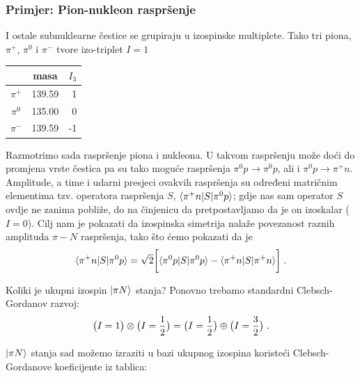 \subsubsection*{Primjer: Pion-nukleon raspršenje}

I ostale subnuklearne čestice se grupiraju u izospinske multiplete.
Tako tri piona, $\pi^+$, $\pi^0$ i $\pi^-$ tvore izo-triplet $I=1$
\begin{center}
\begin{tabular}{ccr}
  & masa & $I_3$ \\ \hline
$\pi^+$  &  139.59  & 1 \\
$\pi^0$  &  135.00  & 0 \\
$\pi^-$  &  139.59  &-1
\end{tabular}
\end{center}

Razmotrimo sada raspršenje piona i nukleona. U takvom raspršenju
može doći do promjena vrste čestica pa su tako moguće raspršenja
$\pi^0 p \to \pi^0 p$, ali i $\pi^0 p \to \pi^+ n$. Amplitude, a time
i udarni presjeci ovakvih raspršenja su određeni matričnim elementima
tzv. operatora raspršenja $S$, $\langle \pi^+ n |S| \pi^0 p  \rangle$; gdje nas
sam operator $S$ ovdje ne zanima pobliže, do na činjenicu da pretpostavljamo
da je on izoskalar ($I=0$). Cilj nam je pokazati da izospinska simetrija
nalaže povezanost raznih amplituda $\pi - N$ raspršenja, tako
što ćemo pokazati da je
\begin{equation}
 \langle \pi^+ n |S| \pi^0 p  \rangle = \sqrt{2} \bigg[
 \langle \pi^0 p |S| \pi^0 p  \rangle -
 \langle \pi^+ n |S| \pi^+ n \rangle \bigg] \;.
\end{equation}

Koliki je ukupni izospin $| \pi N \rangle$ stanja? Ponovno trebamo standardni
Clebsch-Gordanov razvoj:
\begin{equation}
 \big(I=1\big) \otimes  \big(I=\frac{1}{2}\big) = 
\big(I=\frac{1}{2}\big) \oplus \big(I=\frac{3}{2}\big) \;.
\end{equation}

$| \pi N \rangle$ stanja sad možemo izraziti u bazi ukupnog izospina
koristeći Clebsch-Gordanove koeficijente iz tablica:

